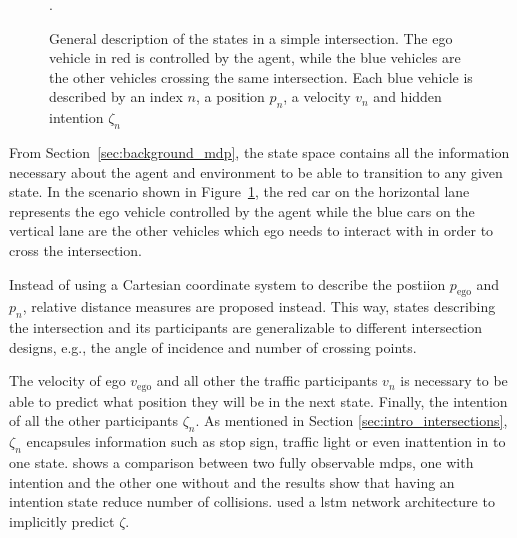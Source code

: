 \begin{figure}[h]
\begin{tikzpicture}
	\end{tikzpicture}
	\caption{General description of the states in a simple intersection. The ego vehicle in red is controlled by the agent, while the blue vehicles are the other vehicles crossing the same intersection. Each blue vehicle is described by an index $n$, a position $p_n$, a velocity $v_n$  and hidden intention $\zeta_n$}.
	\label{fig:intersection_scenario}
	\end{figure}

From Section~\ref{sec:background_mdp}, the state space contains all the information necessary about the agent and environment to be able to transition to any given state. In the scenario shown in Figure~\ref{fig:intersection_scenario}, the red car on the horizontal lane represents the ego vehicle controlled by the agent while the blue cars on the vertical lane are the other vehicles which ego needs to interact with in order to cross the intersection. 

Instead of using a Cartesian coordinate system to describe the postiion $p_\mathrm{ego}$ and $p_n$, relative distance measures are proposed instead. This way, states describing the intersection and its participants are generalizable to different intersection designs, e.g., the angle of incidence and number of crossing points. 

The velocity of ego $v_\mathrm{ego}$ and all other the traffic participants $v_n$ is necessary to be able to predict what position they will be in the next state. Finally, the intention of all the other participants $\zeta_n$. As mentioned in Section \ref{sec:intro_intersections}, $\zeta_n$ encapsules information such as stop sign, traffic light or even inattention in to one state. 
\paperBelief shows a comparison between two fully observable \gls{mdp}s, one with intention and the other one without and the results show that having an intention state reduce number of collisions. 
\paperLSTM used a \gls{lstm} network architecture to implicitly predict $\zeta$. %

